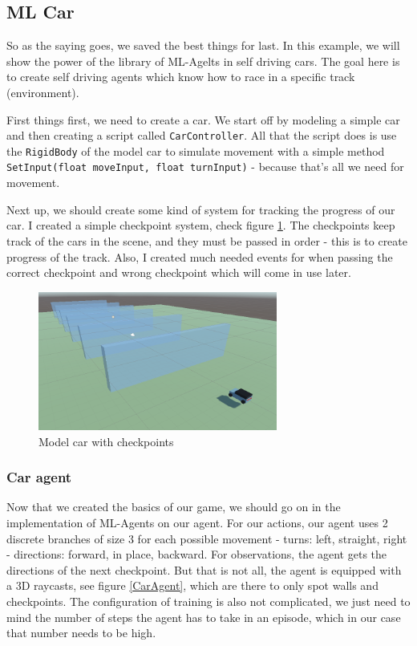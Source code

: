 \documentclass[a4paper, 12pt]{book}
\begin{document}
\subsection{ML Car}

So as the saying goes, we saved the best things for last. In this example, we will show the power of the library of ML-Agelts \cite{MLAgents} in self driving cars. The goal here is to create self driving agents which know how to race in a specific track (environment).

First things first, we need to create a car. We start off by modeling a simple car and then creating a script called \texttt{CarController}. All that the script does is use the \texttt{RigidBody} of the model car to simulate movement with a simple method \texttt{SetInput(float moveInput, float turnInput)} - because that's all we need for movement.

Next up, we should create some kind of system for tracking the progress of our car. I created a simple checkpoint system, check figure \ref{CarWithCheckpoints}. The checkpoints keep track of the cars in the scene, and they must be passed in order - this is to create progress of the track. Also, I created much needed events for when passing the correct checkpoint and wrong checkpoint which will come in use later.

\begin{figure}[h]
\begin{center}
\includegraphics[width=0.7\textwidth]{Images/CarWithCheckpoints.png}
\end{center}
\caption{Model car with checkpoints}
\label{CarWithCheckpoints}
\end{figure}


\subsubsection{Car agent}

Now that we created the basics of our game, we should go on in the implementation of ML-Agents on our agent. For our actions, our agent uses 2 discrete branches of size 3 for each possible movement - turns: left, straight, right - directions: forward, in place, backward. For observations, the agent gets the directions of the next checkpoint. But that is not all, the agent is equipped with a 3D raycasts, see figure \ref{CarAgent}, which are there  to only spot walls and checkpoints. The configuration of training is also not complicated, we just need to mind the number of steps the agent has to take in an episode, which in our case that number needs to be high.
\end{document}
